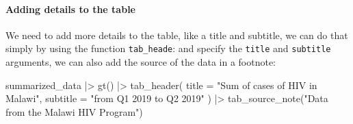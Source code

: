 \documentclass[
]{article}
\newenvironment{Shaded}{\begin{snugshade}}{\end{snugshade}}
\newcommand{\AttributeTok}[1]{\textcolor[rgb]{0.77,0.63,0.00}{#1}}
\newcommand{\FunctionTok}[1]{\textcolor[rgb]{0.00,0.00,0.00}{#1}}
\newcommand{\NormalTok}[1]{#1}
\newcommand{\SpecialCharTok}[1]{\textcolor[rgb]{0.00,0.00,0.00}{#1}}
\newcommand{\StringTok}[1]{\textcolor[rgb]{0.31,0.60,0.02}{#1}}
\begin{document}
\hypertarget{adding-details-to-the-table}{%
\paragraph{Adding details to the
table}\label{adding-details-to-the-table}}

We need to add more details to the table, like a title and subtitle, we
can do that simply by using the function \texttt{tab\_heade}: and
specify the \texttt{title} and \texttt{subtitle} arguments, we can also
add the source of the data in a footnote:

\begin{Shaded}
\begin{Highlighting}[]
\NormalTok{summarized\_data }\SpecialCharTok{|\textgreater{}} 
  \FunctionTok{gt}\NormalTok{() }\SpecialCharTok{|\textgreater{}} 
  \FunctionTok{tab\_header}\NormalTok{(}
    \AttributeTok{title =} \StringTok{"Sum of cases of HIV in Malawi"}\NormalTok{,}
    \AttributeTok{subtitle =} \StringTok{"from Q1 2019 to Q2 2019"}
\NormalTok{  ) }\SpecialCharTok{|\textgreater{}} 
  \FunctionTok{tab\_source\_note}\NormalTok{(}\StringTok{"Data from the Malawi HIV Program"}\NormalTok{)}
\end{Highlighting}
\end{Shaded}
\end{document}
